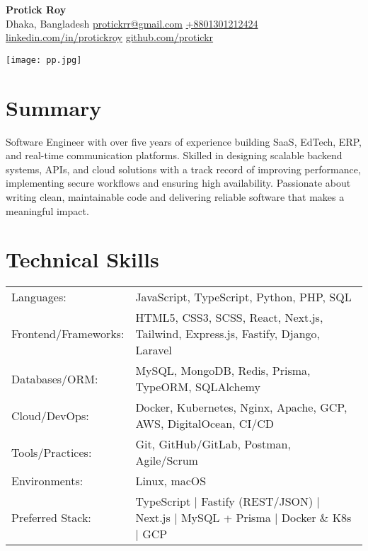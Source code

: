 \documentclass[a4paper,10pt]{article}
\begin{document}
\noindent
\begin{minipage}[c]{0.78\textwidth}
    {\Huge \textbf{Protick Roy}}\\[4pt]
    \small Dhaka, Bangladesh \textbar{}
    \href{mailto:protickrr@gmail.com}{protickrr@gmail.com} \textbar{}
    \href{tel:+8801301212424}{+8801301212424} \textbar{}
    \href{https://www.linkedin.com/in/protickroy}{linkedin.com/in/protickroy} 
    \href{https://github.com/protickr}{github.com/protickr}
\end{minipage}
\hfill
\begin{minipage}[c]{0.12\textwidth}
    \texttt{[image: pp.jpg]} %
\end{minipage}

\vspace{8pt}

\section*{Summary}
Software Engineer with over five years of experience building SaaS, EdTech, ERP, and real-time communication platforms.
Skilled in designing scalable backend systems, APIs, and cloud solutions with a track record of improving performance,
implementing secure workflows and ensuring high availability.
Passionate about writing clean, maintainable code and delivering reliable software that makes a meaningful impact.

\vspace{6pt}

\section*{Technical Skills}
\begin{tabular}{@{}ll}
Languages: & JavaScript, TypeScript, Python, PHP, SQL \\
Frontend/Frameworks: & HTML5, CSS3, SCSS, React, Next.js, Tailwind, Express.js, Fastify, Django, Laravel \\
Databases/ORM: & MySQL, MongoDB, Redis, Prisma, TypeORM, SQLAlchemy \\
Cloud/DevOps: & Docker, Kubernetes, Nginx, Apache, GCP, AWS, DigitalOcean, CI/CD \\
Tools/Practices: & Git, GitHub/GitLab, Postman, Agile/Scrum \\
Environments: & Linux, macOS \\
Preferred Stack: & TypeScript | Fastify (REST/JSON) | Next.js | MySQL + Prisma | Docker \& K8s | GCP \\
\end{tabular}
\end{document}
